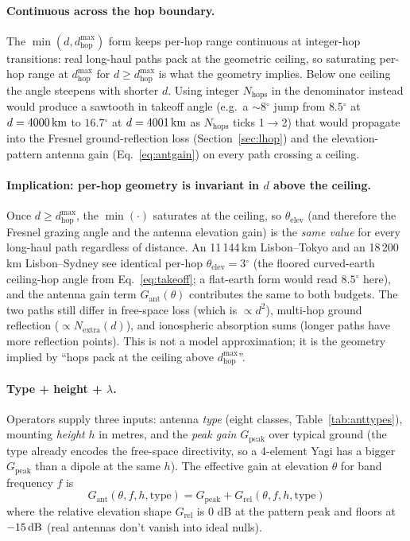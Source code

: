 \documentclass[11pt,a4paper]{article}
\newcommand{\SI}[2]{#1\,\text{#2}}
\newcommand{\dB}{\text{dB}}
\newcommand{\km}{\text{km}}
\newcommand{\degree}{\ensuremath{{}^\circ}}
\begin{document}
\paragraph{Continuous across the hop boundary.}  The
$\min(d, d_{\text{hop}}^{\max})$ form keeps per-hop range continuous
at integer-hop transitions: real long-haul paths pack at the
geometric ceiling, so saturating per-hop range at
$d_{\text{hop}}^{\max}$ for $d \ge d_{\text{hop}}^{\max}$ is what
the geometry implies.  Below one ceiling the angle steepens with
shorter $d$.  Using integer $N_{\text{hops}}$ in the denominator
instead would produce a sawtooth in takeoff angle (e.g.\ a
$\sim 8\degree$ jump from $8.5\degree$ at $d = \SI{4000}{\km}$
to $16.7\degree$ at $d = \SI{4001}{\km}$ as $N_{\text{hops}}$
ticks 1$\to$2) that would propagate into the Fresnel
ground-reflection loss (Section~\ref{sec:lhop}) and the
elevation-pattern antenna gain (Eq.~\ref{eq:antgain}) on every
path crossing a ceiling.

\paragraph{Implication: per-hop geometry is invariant in $d$
above the ceiling.}  Once $d \ge d_{\text{hop}}^{\max}$, the
$\min(\cdot)$ saturates at the ceiling, so $\theta_{\text{elev}}$
(and therefore the Fresnel grazing angle and the antenna
elevation gain) is the \emph{same value} for every long-haul
path regardless of distance.  An 11\,144\,km Lisbon--Tokyo and an
18\,200\,km Lisbon--Sydney see identical per-hop
$\theta_{\text{elev}} = 3\degree$ (the floored curved-earth
ceiling-hop angle from Eq.~\ref{eq:takeoff}; a
flat-earth form would read $8.5\degree$ here), and the antenna gain
term $G_{\text{ant}}(\theta)$
contributes the same to both budgets.  The two paths still
differ in free-space loss (which is $\propto d^2$),
multi-hop ground reflection ($\propto N_{\text{extra}}(d)$), and
ionospheric absorption sums (longer paths have more reflection
points).  This is not a model approximation; it is the geometry
implied by ``hops pack at the ceiling above $d_{\text{hop}}^{\max}$''.

\paragraph{Type + height + $\lambda$.}  Operators supply three inputs:
antenna \emph{type} (eight classes, Table~\ref{tab:anttypes}), mounting
\emph{height} $h$ in metres, and the \emph{peak gain} $G_{\text{peak}}$
over typical ground (the type already encodes the free-space
directivity, so a 4-element Yagi has a bigger $G_{\text{peak}}$ than
a dipole at the same $h$).  The effective gain at elevation $\theta$
for band frequency $f$ is
\begin{equation}\label{eq:antgain}
  G_{\text{ant}}(\theta, f, h, \text{type}) =
    G_{\text{peak}} + G_{\text{rel}}(\theta, f, h, \text{type})
\end{equation}
where the relative elevation shape $G_{\text{rel}}$ is 0 dB at the
pattern peak and floors at $-\SI{15}{\dB}$ (real antennas don't vanish
into ideal nulls).
\end{document}
